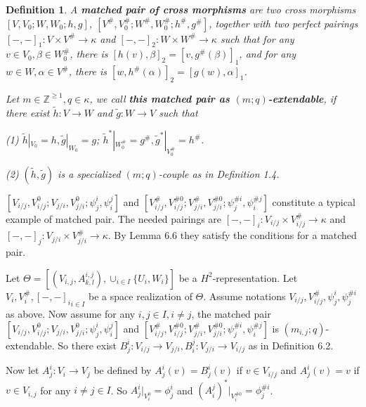 \def\CTEXPreproc{Created by ctex v0.2.12, don't edit!}\documentclass[11pt]{article}
\newtheorem{defi}{Definition}[section]
\begin{document}
\begin{defi} A \textbf{matched pair of cross morphisms} are two cross morphisms $[V, V_0 ; W, W_0 ; h,g   ]$,
$[V^{\#}, V^{\#}_0 ; W^{\#}, W^{\#}_0 ; h^{\#},g^{\#}   ]$, together with two perfect pairings $[-,-]_1 : V\times V^{\#} \rightarrow \kappa $ and $[-,-]_2 : W\times W^{\#} \rightarrow \kappa $ such that for any $v\in V_0  , \beta\in W^{\#}_0   $,  there is $[ h(v) ,\beta ]_2 =[ v, g^{\#}(\beta)  ]_1 $, and for any
$w\in W, \alpha\in V^{\#}$, there is $[w, h^{\#}(\alpha)   ]_2 =[g(w) , \alpha   ]_1  $.

Let $m\in \mathbb{Z}^{\geq 1}, q \in \kappa$, we call \textbf{this matched pair as $(m;q)$-extendable}, if there exist $\tilde{h}: V\rightarrow W$ and $\tilde{g}:W\rightarrow V$ such that

\noindent(1) $\tilde{h}|_{V_0} = h , \tilde{g}|_{W_0}=g $; $\tilde{h}^{*}|_{W^{\#}_0} = g^{\#} , \tilde{g}^{*}|_{V^{\#}_0}=h^{\#} $.

\noindent(2) $( \tilde{h} ,\tilde{g}   )$ is a specialized $(m;q)$-couple as in Definition 1.4.
\end{defi}



 $[V_{i/j} , V^{0}_{i/j}; V_{j/i}, V^0 _{j/i}; \psi^i _j , \psi^j _i   ]$ and
 $[V^{\#}_{i/j} , V^{\# 0}_{i/j}; V^{\#}_{j/i}, V^{\# 0} _{j/i}; \psi^{\# i} _j , \psi^{\# j} _i   ]$ constitute a typical example of matched pair. The needed pairings are  $[-,-]_i : V_{i/j} \times V^{\#}_{i/j}\rightarrow \kappa$ and $[-,-]_j : V_{j/i} \times V^{\#}_{j/i}\rightarrow \kappa$. By Lemma 6.6 they satisfy the conditions for a matched pair.

Let $\Theta = [ ( V_{i,j} , A^{i,j}_{k,l} ) ,  \cup_{i\in I} \{ U_i ,W_i \}    ] $ be a $H^2$-representation. Let
${ V_i , V^{\#}_i ,[-,-]_i  }_{i\in I } $ be a  space realization of $\Theta$. Assume notations $V_{i/j}, V^{\#}_{i/j}, \psi^i _j , \psi^{\# i} _j$ as above. Now assume for any $i, j \in I ,i\neq j$, the matched pair  $[V_{i/j} , V^{0}_{i/j}; V_{j/i}, V^0 _{j/i}; \psi^i _j , \psi^j _i   ]$ and
 $[V^{\#}_{i/j} , V^{\# 0}_{i/j}; V^{\#}_{j/i}, V^{\# 0} _{j/i}; \psi^{\# i} _j , \psi^{\# j} _i   ]$ is $(m_{i,j}; q)$-extendable. So there exist $B^i _j : V_{i/j} \rightarrow V_{j/i} , B^j _i :V_{j/i} \rightarrow V_{i/j} $ as in Definition 6.2.

 Now let $A^i _j : V_i \rightarrow V_j $ be defined by $A^i _j (v)= B^i _j (v) $ if $v\in V_{i/j}$ and $A^i _j (v) = v$ if $v\in V_{i,j}$ for any $i\neq j \in I$. So $A^i _j |_{V^0 _i}=\phi^i _j$ and $(A^j _i )^{*}|_{  V^{\# 0}_i }= \phi^{\# i}_j$.
\end{document}
